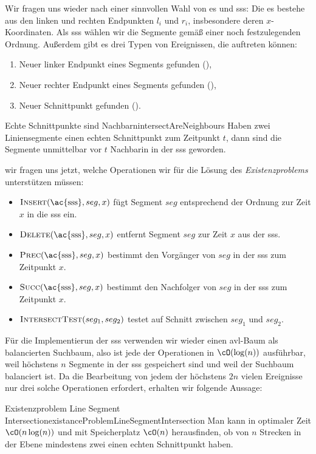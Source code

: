 \documentclass[language=ngerman,algolist,acrolist]{TemplateLecture}
\begin{document}
Wir fragen uns wieder nach einer sinnvollen Wahl von \acl{es} und \acl{sss}: Die \ac{es} bestehe aus den linken und rechten Endpunkten $l_i$ und $r_i$, insbesondere deren $x$-Koordinaten. Als \ac{sss} wählen wir die Segmente gemäß einer noch festzulegenden Ordnung. Außerdem gibt es drei Typen von Ereignissen, die auftreten können:
\begin{enumerate}
    \item Neuer linker Endpunkt eines Segments gefunden (\LeftEnd),
    \item Neuer rechter Endpunkt eines Segments gefunden (\RightEnd),
    \item Neuer Schnittpunkt gefunden (\Intersect).
\end{enumerate}

\begin{lem}{Echte Schnittpunkte sind Nachbarn}{intersectAreNeighbours}
    Haben zwei Liniensegmente einen echten Schnittpunkt zum Zeitpunkt $t$, dann sind die Segmente unmittelbar vor $t$ Nachbarin in der \ac{sss} geworden.
\end{lem}

wir fragen uns jetzt, welche Operationen wir für die Lösung des \emph{Existenzproblems} unterstützen müssen:
\begin{itemize}
    \item $\Insert(\text{\ac{sss}}, seg, x)$ fügt Segment $seg$ entsprechend der Ordnung zur Zeit $x$ in die \ac{sss} ein.
    \item $\Delete(\text{\ac{sss}}, seg, x)$ entfernt Segment $seg$ zur Zeit $x$ aus der \ac{sss}.
    \item $\Prec(\text{\ac{sss}}, seg, x)$ bestimmt den Vorgänger von $seg$ in der \ac{sss} zum Zeitpunkt $x$.
    \item $\Succ(\text{\ac{sss}}, seg, x)$ bestimmt den Nachfolger von $seg$ in der \ac{sss} zum Zeitpunkt $x$.
    \item $\textsc{IntersectTest}(seg_1, seg_2)$ testet auf Schnitt zwischen $seg_1$ und $seg_2$.
\end{itemize}

Für die Implementierun der \ac{sss} verwenden wir wieder einen \ac{avl}-Baum als balancierten Suchbaum, also ist jede der Operationen in $\cO(\log(n))$ ausführbar, weil höchstens $n$ Segmente in der \ac{sss} gespeichert sind und weil der Suchbaum balanciert ist. Da die Bearbeitung von jedem der höchstens $2n$ vielen Ereignisse nur drei solche Operationen erfordert, erhalten wir folgende Aussage:

\begin{thm}{Existenzproblem Line Segment Intersection}{existanceProblemLineSegmentIntersection}
    Man kann in optimaler Zeit $\cO(n \log(n))$ und mit Speicherplatz $\cO(n)$ herausfinden, ob von $n$ Strecken in der Ebene mindestens zwei einen echten Schnittpunkt haben.
\end{thm}
\end{document}
